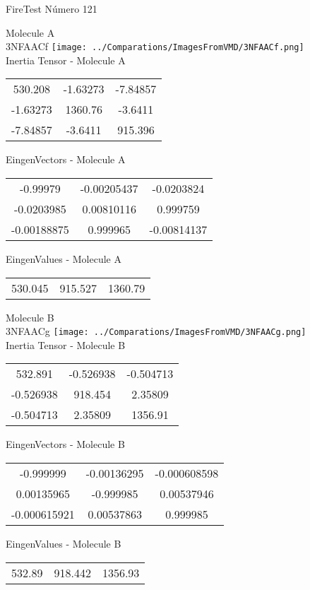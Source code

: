 \vtab[-2cm]
\begin{center}
{\large FireTest \tab Número 121}
\end{center}
\begin{multicols}{2}
\begin{center}

Molecule A \\ 
3NFAACf
\texttt{[image: ../Comparations/ImagesFromVMD/3NFAACf.png]}
\\
Inertia Tensor - Molecule A \\
\vtab

\begin{tabular}{|c c c|}
530.208	 & 	-1.63273	 & 	-7.84857	 \\
-1.63273	 & 	1360.76	 & 	-3.6411	 \\
-7.84857	 & 	-3.6411	 & 	915.396
\end{tabular}

\vtab
 EingenVectors - Molecule A     \\
\vtab
\begin{tabular}{|c c c|}
-0.99979	 & 	-0.00205437	 & 	-0.0203824	 \\
-0.0203985	 & 	0.00810116	 & 	0.999759	 \\
-0.00188875	 & 	0.999965	 & 	-0.00814137
\end{tabular}

\vtab
 EingenValues - Molecule A     \\
\vtab
\begin{tabular}{|c c c|}
530.045	 & 	915.527	 & 	1360.79	 \\
\end{tabular}
\columnbreak

Molecule B \\ 
3NFAACg
\texttt{[image: ../Comparations/ImagesFromVMD/3NFAACg.png]}
\\
Inertia Tensor - Molecule B \\
\vtab

\begin{tabular}{|c c c|}
532.891	 & 	-0.526938	 & 	-0.504713	 \\
-0.526938	 & 	918.454	 & 	2.35809	 \\
-0.504713	 & 	2.35809	 & 	1356.91
\end{tabular}

\vtab
 EingenVectors - Molecule B     \\
\vtab
\begin{tabular}{|c c c|}
-0.999999	 & 	-0.00136295	 & 	-0.000608598	 \\
0.00135965	 & 	-0.999985	 & 	0.00537946	 \\
-0.000615921	 & 	0.00537863	 & 	0.999985
\end{tabular}

\vtab
 EingenValues - Molecule B     \\
\vtab
\begin{tabular}{|c c c|}
532.89	 & 	918.442	 & 	1356.93	 \\
\end{tabular}

\end{center}
\end{multicols}
